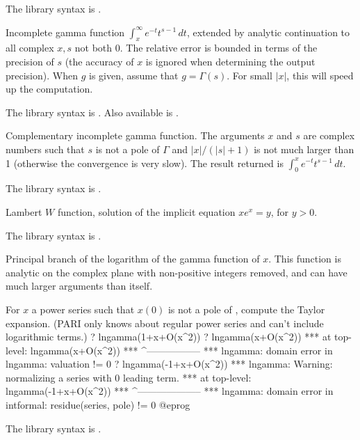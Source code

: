 The library syntax is .

\label{se:incgam}
Incomplete gamma function $\int_x^\infty e^{-t}t^{s-1}\,dt$, extended by
analytic continuation to all complex $x, s$ not both $0$. The relative error
is bounded in terms of the precision of $s$ (the accuracy of $x$ is ignored
when determining the output precision). When $g$ is given, assume that
$g=\Gamma(s)$. For small $|x|$, this will speed up the computation.

The library syntax is .
Also available is .

\label{se:incgamc}
Complementary incomplete gamma function.
The arguments $x$ and $s$ are complex numbers such that $s$ is not a pole of
$\Gamma$ and $|x|/(|s|+1)$ is not much larger than 1 (otherwise the
convergence is very slow). The result returned is $\int_0^x
e^{-t}t^{s-1}\,dt$.

The library syntax is .

\label{se:lambertw}
Lambert $W$ function, solution of the implicit equation $xe^x=y$,
for $y > 0$.

The library syntax is .

\label{se:lngamma}
Principal branch of the logarithm of the gamma function of $x$. This
function is analytic on the complex plane with non-positive integers
removed, and can have much larger arguments than  itself.

For $x$ a power series such that $x(0)$ is not a pole of ,
compute the Taylor expansion. (PARI only knows about regular power series
and can't include logarithmic terms.)
\bprog
? lngamma(1+x+O(x^2))
? lngamma(x+O(x^2))
 ***   at top-level: lngamma(x+O(x^2))
 ***                 ^-----------------
 *** lngamma: domain error in lngamma: valuation != 0
? lngamma(-1+x+O(x^2))
 *** lngamma: Warning: normalizing a series with 0 leading term.
 ***   at top-level: lngamma(-1+x+O(x^2))
 ***                 ^--------------------
 *** lngamma: domain error in intformal: residue(series, pole) != 0
@eprog

The library syntax is .

